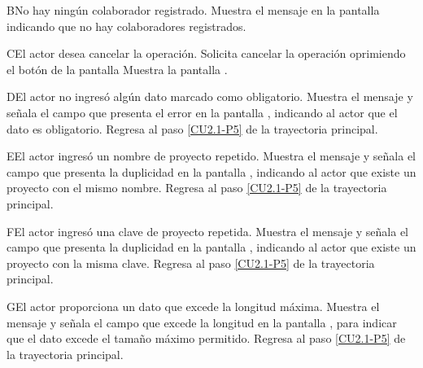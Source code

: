
		\begin{UCtrayectoriaA}{B}{No hay ningún colaborador registrado.}
	\UCpaso[\UCsist] Muestra el mensaje  en la pantalla  indicando que no hay colaboradores registrados.
		\end{UCtrayectoriaA}
	
	\begin{UCtrayectoriaA}{C}{El actor desea cancelar la operación.}
		\UCpaso[\UCactor] Solicita cancelar la operación oprimiendo el botón  de la pantalla 
		\UCpaso[\UCsist] Muestra la pantalla .
	\end{UCtrayectoriaA}

	\begin{UCtrayectoriaA}{D}{El actor no ingresó algún dato marcado como obligatorio.}
		\UCpaso[\UCsist] Muestra el mensaje  y señala el campo que presenta el error en la pantalla , indicando al actor que el dato es obligatorio.
		\UCpaso Regresa al paso \ref{CU2.1-P5} de la trayectoria principal.
	\end{UCtrayectoriaA}
	
	\begin{UCtrayectoriaA}{E}{El actor ingresó un nombre de proyecto repetido.}
		\UCpaso[\UCsist] Muestra el mensaje  y señala el campo que presenta la duplicidad en la pantalla , indicando al actor que existe un proyecto con el mismo nombre.
		\UCpaso Regresa al paso \ref{CU2.1-P5} de la trayectoria principal.
	\end{UCtrayectoriaA}

	\begin{UCtrayectoriaA}{F}{El actor ingresó una clave de proyecto repetida.}
		\UCpaso[\UCsist] Muestra el mensaje  y señala el campo que presenta la duplicidad en la pantalla , indicando al actor que existe un proyecto con la misma clave.
		\UCpaso Regresa al paso \ref{CU2.1-P5} de la trayectoria principal.
	\end{UCtrayectoriaA}

	\begin{UCtrayectoriaA}{G}{El actor proporciona un dato que excede la longitud máxima.}
		\UCpaso[\UCsist] Muestra el mensaje  y señala el campo que excede la longitud en la pantalla , para indicar que el dato excede el tamaño máximo permitido.
		\UCpaso Regresa al paso \ref{CU2.1-P5} de la trayectoria principal.
	\end{UCtrayectoriaA}


